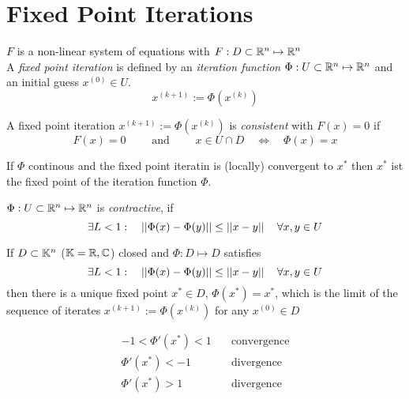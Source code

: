 \section{Fixed Point Iterations}
	$F$ is a non-linear system of equations with $F: D \subset \mathbb{R}^n \mapsto \mathbb{R}^n$\\
	A \emph{fixed point iteration} is defined by an \emph{iteration function} \( \Phi: U \subset \mathbb{R}^n \mapsto \mathbb{R}^n \) and an initial guess \( x^{(0)} \in U\).
	\[
		x^{(k+1)} := \Phi\left(x^{(k)}\right)
	\]
		\begin{definition}
		 A fixed point iteration $x^{(k+1)} := \Phi\left(x^{(k)}\right)$ is \emph{consistent} with $F(x)= 0$ if
		 \[
		  F(x) = 0 \qquad \text{ and } \qquad x \in U \cap D \quad \Longleftrightarrow \quad \Phi(x) = x
		 \]
		\end{definition}
		If $\Phi$ continous and the fixed point iteratin is (locally) convergent to $x^*$ then $x^*$ ist the fixed point of the iteration function $\Phi$.
	
		\begin{definition}
			\( \Phi: U \subset \mathbb{R}^n \mapsto \mathbb{R}^n\) is \emph{contractive}, if
			\[
			 \exists L < 1: \quad \left|\left| \Phi(x)-\Phi(y) \right|\right| \leq \left|\left| x-y \right|\right| \quad \forall x,y \in U
			\]
		\end{definition}
		
		\begin{theorem}
		 If $D\subset \mathbb{K}^n$ ($\mathbb{K} = \mathbb{R}, \mathbb{C}$) closed and $\Phi: D \mapsto D$ satisfies
		 \[
			 \exists L < 1: \quad \left|\left| \Phi(x)-\Phi(y) \right|\right| \leq \left|\left| x-y \right|\right| \quad \forall x,y \in U
		 \]
		 then there is a unique fixed point $x^* \in D$, $\Phi(x^*)=x^*$, which is the limit of the sequence of iterates $x^{(k+1)}:=\Phi\left(x^{(k)}\right)$ for any $x^{(0)} \in D$
		\end{theorem}
		
		\begin{align*}
		 -1 < \Phi'(x^*) < 1 & \quad \text{convergence}\\
		 \Phi'(x^*) < -1 & \quad \text{divergence}\\
		 \Phi'(x^*) > 1 & \quad \text{divergence}
		\end{align*}
		
